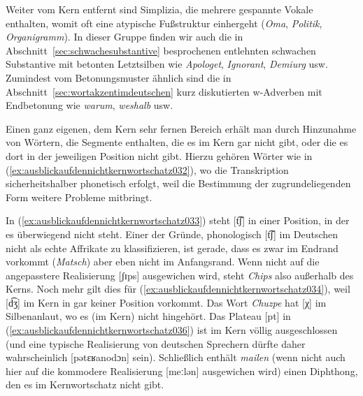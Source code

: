 Weiter vom Kern entfernt sind Simplizia, die mehrere gespannte Vokale enthalten, womit oft eine atypische Fußstruktur einhergeht (\textit{Oma}, \textit{Politik}, \textit{Organigramm}).
In dieser Gruppe finden wir auch die in Abschnitt~\ref{sec:schwachesubstantive} besprochenen entlehnten schwachen Substantive mit betonten Letztsilben wie \textit{Apologet}, \textit{Ignorant}, \textit{Demiurg} usw.
Zumindest vom Betonungsmuster ähnlich sind die in Abschnitt~\ref{sec:wortakzentimdeutschen} kurz diskutierten w-Adverben mit Endbetonung wie \textit{warum}, \textit{weshalb} usw.

Einen ganz eigenen, dem Kern sehr fernen Bereich erhält man durch Hinzunahme von Wörtern, die Segmente enthalten, die es im Kern gar nicht gibt, oder die es dort in der jeweiligen Position nicht gibt.
Hierzu gehören Wörter wie in (\ref{ex:ausblickaufdennichtkernwortschatz032}), wo die Transkription sicherheitshalber phonetisch erfolgt, weil die Bestimmung der zugrundeliegenden Form weitere Probleme mitbringt.

\begin{exe}
  \ex\label{ex:ausblickaufdennichtkernwortschatz032}
  \begin{xlist}
  \end{xlist}
\end{exe}

In (\ref{ex:ausblickaufdennichtkernwortschatz033}) steht [t͡ʃ] in einer Position, in der es überwiegend nicht steht.
Einer der Gründe, phonologisch [t͡ʃ] im Deutschen nicht als echte Affrikate zu klassifizieren, ist gerade, dass es zwar im Endrand vorkommt (\textit{Matsch}) aber eben nicht im Anfangsrand.
Wenn nicht auf die angepasstere Realisierung [ʃɪps] ausgewichen wird, steht \textit{Chips} also außerhalb des Kerns.
Noch mehr gilt dies für (\ref{ex:ausblickaufdennichtkernwortschatz034}), weil [d͡ʒ] im Kern in gar keiner Position vorkommt.
Das Wort \textit{Chuzpe} hat [χ] im Silbenanlaut, wo es (im Kern) nicht hingehört.
Das Plateau [pt] in (\ref{ex:ausblickaufdennichtkernwortschatz036}) ist im Kern völlig ausgeschlossen (und eine typische Realisierung von deutschen Sprechern dürfte daher wahrscheinlich [pətɛʁanodɔn] sein).
Schließlich enthält \textit{mailen} (wenn nicht auch hier auf die kommodere Realisierung [meːlən] ausgewichen wird) einen Diphthong, den es im Kernwortschatz nicht gibt.

